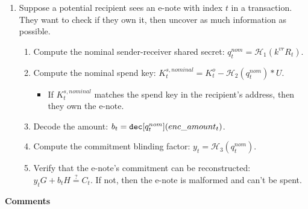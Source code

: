 \begin{enumerate}
    \item Suppose a potential recipient sees an e-note with index $t$ in a transaction. They want to check if they own it, then uncover as much information as possible.
    \begin{enumerate}
        \item Compute the nominal sender-receiver shared secret: $q^{nom}_t = \mathcal{H}_1(k^{vr} R_t)$.
        \item Compute the nominal spend key: $K^{s,nominal}_t = K^o_t - \mathcal{H}_2(q^{nom}_t)*U$.
        \begin{itemize}
            \item If $K^{s,nominal}_t$ matches the spend key in the recipient's address, then they own the e-note.
        \end{itemize}
        \item Decode the amount: $b_t = \textrm{\tt dec}[q^{nom}_t](enc\_amount_t)$.
        \item Compute the commitment blinding factor: $y_t = \mathcal{H}_3(q^{nom}_t)$.
        \item Verify that the e-note's commitment can be reconstructed: $y_t G + b_t H \stackrel{?}{=} C_t$. If not, then the e-note is malformed and can't be spent.
    \end{enumerate}
\end{enumerate}

\textbf{Comments}


